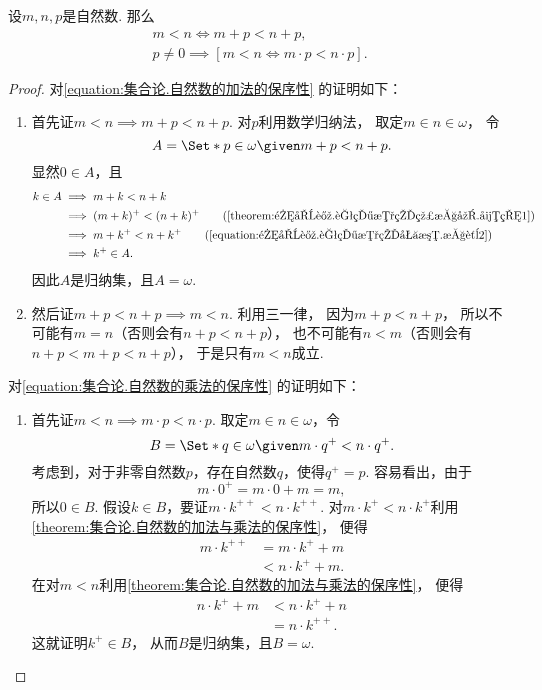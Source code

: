 \begin{theorem}\label{theorem:集合论.自然数的加法与乘法的保序性}
设\(m,n,p\)是自然数.
那么\begin{gather}
	m < n \iff m + p < n + p,
	\label{equation:集合论.自然数的加法的保序性} \\
	p \neq 0 \implies [m < n \iff m \cdot p < n \cdot p].
	\label{equation:集合论.自然数的乘法的保序性}
\end{gather}
\begin{proof}
对\cref{equation:集合论.自然数的加法的保序性} 的证明如下：
\begin{enumerate}
	\item 首先证\(m < n \implies m + p < n + p\).
	对\(p\)利用数学归纳法，
	取定\(m \in n \in \omega\)，
	令\begin{equation*}
		A = \Set*{
			p \in \omega
			\given
			m + p < n + p
		}.
	\end{equation*}
	显然\(0 \in A\)，且\begin{align*}
		k \in A
		&\implies m+k<n+k \\
		&\implies (m+k)^+<(n+k)^+
			\tag{\cref{theorem:集合论.自然数的线性序.引理1}} \\
		&\implies m+k^+<n+k^+
			\tag{\cref{equation:集合论.自然数的加法.性质2}} \\
		&\implies k^+ \in A.
	\end{align*}
	因此\(A\)是归纳集，且\(A = \omega\).

	\item 然后证\(m + p < n + p \implies m < n\).
	利用三一律，
	因为\(m + p < n + p\)，
	所以不可能有\(m = n\)（否则会有\(n+p<n+p\)），
	也不可能有\(n < m\)（否则会有\(n+p<m+p<n+p\)），
	于是只有\(m < n\)成立.
\end{enumerate}

对\cref{equation:集合论.自然数的乘法的保序性} 的证明如下：
\begin{enumerate}
	\item 首先证\(m < n \implies m \cdot p < n \cdot p\).
	取定\(m \in n \in \omega\)，令\begin{equation*}
		B = \Set*{
			q \in \omega
			\given
			m \cdot q^+ < n \cdot q^+
		}.
	\end{equation*}
	考虑到，对于非零自然数\(p\)，存在自然数\(q\)，使得\(q^+ = p\).
	容易看出，由于\begin{equation*}
		m \cdot 0^+ = m \cdot 0 + m = m,
	\end{equation*}
	所以\(0 \in B\).
	假设\(k \in B\)，要证\(m \cdot k^{++} < n \cdot k^{++}\).
	对\(m \cdot k^+ < n \cdot k^+\)利用\cref{theorem:集合论.自然数的加法与乘法的保序性}，
	便得\begin{align*}
		m \cdot k^{++}
		&= m \cdot k^+ + m \\
		&< n \cdot k^+ + m.
	\end{align*}
	在对\(m < n\)利用\cref{theorem:集合论.自然数的加法与乘法的保序性}，
	便得\begin{align*}
		n \cdot k^+ + m
		&< n \cdot k^+ + n \\
		&= n \cdot k^{++}.
	\end{align*}
	这就证明\(k^+ \in B\)，
	从而\(B\)是归纳集，且\(B = \omega\).


\end{enumerate}
\end{proof}
\end{theorem}
